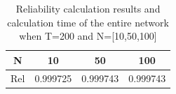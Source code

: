 \documentclass[journal]{IEEEtran}
\begin{document}
    \begin{table}[!t]
        \renewcommand{\arraystretch}{1.3}
        \caption{Reliability calculation results and calculation time of the entire network when T=200 and N=[10,50,100]}
        \label{tab11}
        \centering
        \begin{tabular}{|c|c|c|c|}
            \hline
            N   & 10       & 50       & 100      \\
            \hline
            Rel & 0.999725 & 0.999743 & 0.999743 \\
            \hline
        \end{tabular}
    \end{table}


%
%



%
%
\end{document}
